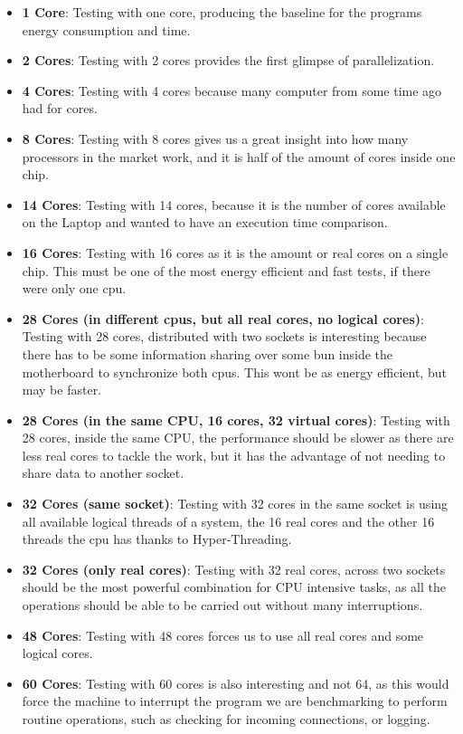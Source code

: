 \begin{itemize}
    \item \textbf{1 Core}: Testing with one core, producing the baseline for the programs energy consumption and time.
    \item \textbf{2 Cores}: Testing with 2 cores provides the first glimpse of parallelization.
    \item \textbf{4 Cores}: Testing with 4 cores because many computer from some time ago had for cores.
    \item \textbf{8 Cores}: Testing with 8 cores gives us a great insight into how many processors in the market work, and it is half of the amount of cores inside one chip.
    \item \textbf{14 Cores}: Testing with 14 cores, because it is the number of cores available on the Laptop and wanted to have an execution time comparison. 
    \item \textbf{16 Cores}: Testing with 16 cores as it is the amount or real cores on a single chip. This must be one of the most energy efficient and fast tests, if there were only one \gls{cpu}.
    \item \textbf{28 Cores (in different \glspl{cpu}, but all real cores, no logical cores)}: Testing with 28 cores, distributed with two sockets is interesting because there has to be some information sharing over some bun inside the motherboard to synchronize both \glspl{cpu}. This wont be as energy efficient, but may be faster.
    \item \textbf{28 Cores (in the same CPU, 16 cores, 32 virtual cores)}: Testing with 28 cores, inside the same CPU, the performance should be slower as there are less real cores to tackle the work, but it has the advantage of not needing to share data to another socket.
    \item \textbf{32 Cores (same socket)}: Testing with 32 cores in the same socket is using all available logical threads of a system, the 16 real cores and the other 16 threads the \gls{cpu} has thanks to Hyper-Threading.
    \item \textbf{32 Cores (only real cores)}: Testing with 32 real cores, across two sockets should be the most powerful combination for CPU intensive tasks, as all the operations should be able to be carried out without many interruptions.
    \item \textbf{48 Cores}: Testing with 48 cores forces us to use all real cores and some logical cores.
    \item \textbf{60 Cores}: Testing with 60 cores is also interesting and not 64, as this would force the machine to interrupt the program we are benchmarking to perform routine operations, such as checking for incoming connections, or logging.
\end{itemize}

